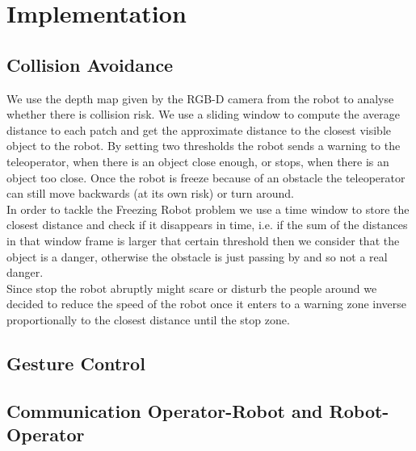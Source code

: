 \section{Implementation}
\label{sec:implementation}

\subsection{Collision Avoidance}
We use the depth map given by the RGB-D camera from the robot to analyse whether there is collision risk. We use a sliding window to compute the average distance to each patch and get the approximate distance to the closest visible object to the robot. By setting two thresholds the robot sends a warning to the teleoperator, when there is an object close enough, or stops, when there is an object too close. Once the robot is freeze because of an obstacle the teleoperator can still move backwards (at its own risk) or turn around. \\


In order to tackle the Freezing Robot problem we use a time window to store the closest distance and check if it disappears in time, i.e. if the sum of the distances in that window frame is larger that certain threshold then we consider that the object is a danger, otherwise the obstacle is just passing by and so not a real danger.\\

Since stop the robot abruptly might scare or disturb the people around we decided to reduce the speed of the robot once it enters to a warning zone inverse proportionally to the closest distance until the stop zone. 

\subsection{Gesture Control}

\subsection{Communication Operator-Robot and Robot-Operator}